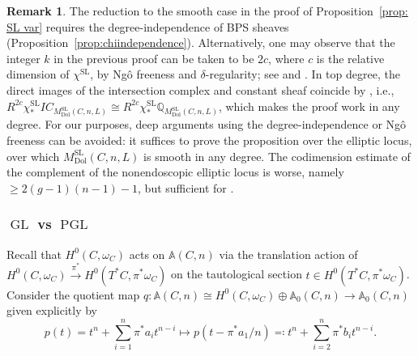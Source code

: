 \documentclass[11pt,reqno]{amsart}
\theoremstyle{plain} %
\theoremstyle{definition}
\newtheorem{remark}[theorem]{Remark}
\newcommand{\QQ}{\mathbb{Q}}
\DeclareMathOperator{\GL}{GL}
\DeclareMathOperator{\SL}{SL}
\DeclareMathOperator{\PGL}{PGL}
\newcommand{\Dol}{\mathrm{Dol}}
\newcommand{\IC}{IC}
\renewcommand{\AA}{\mathbb{A}}
\begin{document}
\begin{remark}
The reduction to the smooth case in the proof of Proposition~\ref{prop: SL var} %
requires the degree-independence of BPS sheaves (Proposition~\ref{prop:chiindependence}). Alternatively, one may observe that the integer $k$ in the previous proof can be taken to be $2c$, where $c$ is the relative dimension of $\chi^{\SL}$, by Ng\^{o} freeness and $\delta$-regularity; see \cite[Proposition 1.5]{chi-indep} and \cite[Theorem A]{dCFHM}. In top degree, the direct images of the intersection complex and constant sheaf coincide by \cite[Proposition~3.3]{MM}, i.e., $R^{2c} \chi^{\SL}_{*} \IC_{M^{\SL}_{\Dol}(C,n,L)} \cong R^{2c} \chi^{\SL}_{*} \QQ_{M^{\SL}_{\Dol}(C,n,L)}$, which makes the proof work in any degree.  For our purposes, deep arguments using the degree-independence or Ng\^{o} freeness can be avoided: it suffices to prove the proposition over the elliptic locus, over which $M^{\SL}_{\Dol}(C,n,L)$ is smooth in any degree.
The codimension estimate of the complement of the nonendoscopic elliptic locus is worse, namely $\geq 2(g-1)(n-1)-1$, but sufficient for  .
\end{remark}

 \subsubsection{$\GL$ vs $\PGL$}
Recall that $H^0(C, \omega_C)$ acts on $\AA(C,n)$ via the translation action of $H^0(C, \omega_C) \xrightarrow{\pi^*} H^0(T^*C, \pi^*\omega_C)$ on the tautological section $t \in H^0(T^*C, \pi^* \omega_C)$.
Consider the quotient map $q \colon \AA(C,n) \cong H^0(C, \omega_C) \oplus \AA_0(C,n)\to \AA_0(C,n)$ given explicitly by
$$p(t) = t^n + \sum^{n}_{i=1} \pi^*a_{i}t^{n-i} \mapsto p(t-\pi^*a_1/n)\eqqcolon t^n + \sum^{n}_{i=2} \pi^*b_{i}t^{n-i}.$$ %
\end{document}
